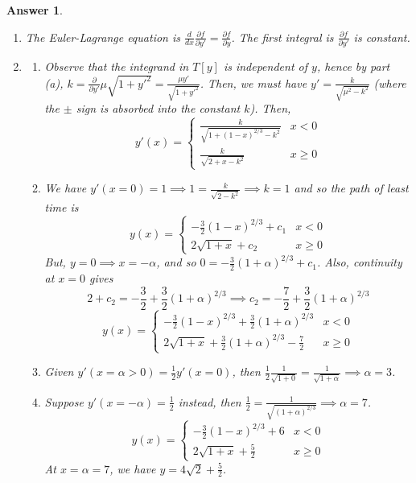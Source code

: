 \documentclass[a4paper]{article}
\newtheorem{ans}{Answer}[section]
\theoremstyle{new}
\begin{document}
\begin{ans}\leavevmode
\begin{enumerate}[label=(\alph*)]
\item The Euler-Lagrange equation is $\frac{d}{dx}\frac{\partial f}{\partial y'}=\frac{\partial f}{\partial y}$. The first integral is $\frac{\partial f}{\partial y'}$ is constant.
\item
\begin{enumerate}[label=(\roman*)]
\item Observe that the integrand in $T[y]$ is independent of $y$, hence by part (a), $k=\frac{\partial}{\partial y'}\mu\sqrt{1+y'^2}=\frac{\mu y'}{\sqrt{1+y'^2}}$. Then, we must have $y'=\frac{k}{\sqrt{\mu^2-k^2}}$ (where the $\pm$ sign is absorbed into the constant $k$). Then,
$$y'(x)=
\left\{
        \begin{array}{ll}
      \frac{k}{\sqrt{1+(1-x)^{2/3}-k^2}} & x<0 \\
      \frac{k}{\sqrt{2+x-k^2}} & x\geq0 
        \end{array}
    \right.$$
\item We have $y'(x=0)=1\implies 1=\frac{k}{\sqrt{2-k^2}}\implies k=1$ and so the path of least time is
$$y(x)=
\left\{
        \begin{array}{ll}
      -\frac{3}{2}(1-x)^{2/3}+c_1 & x<0 \\
      2\sqrt{1+x}+c_2 & x\geq0 
        \end{array}
    \right.$$
But, $y=0\implies x=-\alpha$, and so $0=-\frac{3}{2}(1+\alpha)^{2/3}+c_1$. Also, continuity at $x=0$ gives
$$2+c_2=-\frac{3}{2}+\frac{3}{2}(1+\alpha)^{2/3}\implies c_2=-\frac{7}{2}+\frac{3}{2}(1+\alpha)^{2/3}$$
$$y(x)=
\left\{
        \begin{array}{ll}
      -\frac{3}{2}(1-x)^{2/3}+\frac{3}{2}(1+\alpha)^{2/3} & x<0 \\
      2\sqrt{1+x}+\frac{3}{2}(1+\alpha)^{2/3}-\frac{7}{2} & x\geq0 
        \end{array}
    \right.$$
\item Given $y'(x=\alpha>0)=\frac{1}{2}y'(x=0)$, then $\frac{1}{2}\frac{1}{\sqrt{1+0}}=\frac{1}{\sqrt{1+\alpha}}\implies\alpha=3$.
\item Suppose $y'(x=-\alpha)=\frac{1}{2}$ instead, then $\frac{1}{2}=\frac{1}{\sqrt{(1+\alpha)^{2/3}}}\implies\alpha=7$.
$$y(x)=
\left\{
        \begin{array}{ll}
      -\frac{3}{2}(1-x)^{2/3}+6 & x<0 \\
      2\sqrt{1+x}+\frac{5}{2} & x\geq0 
        \end{array}
    \right.$$
At $x=\alpha=7$, we have $y=4\sqrt{2}+\frac{5}{2}$.
\end{enumerate}
\end{enumerate}
\end{ans}
\end{document}
